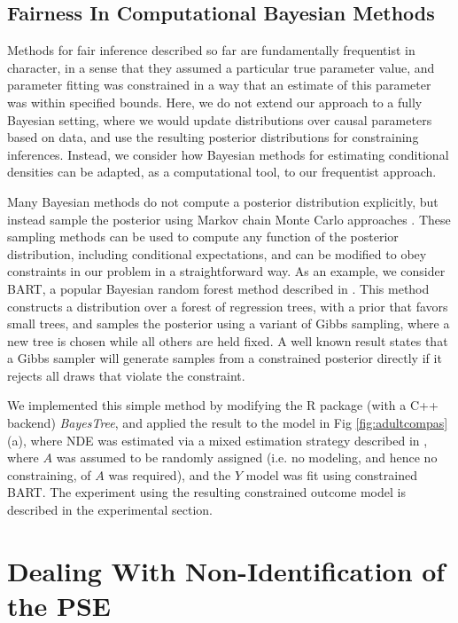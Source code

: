\documentclass[letterpaper]{article} %
\newcommand{\citep}{\cite}
\begin{document}
\subsection{Fairness In Computational Bayesian Methods}
\label{subsec:bayes}

Methods for fair inference described so far are fundamentally frequentist in character, in a sense that they assumed a particular true parameter value, and parameter fitting was constrained in a way that an estimate of this parameter was within specified bounds.  Here, we do not extend our approach to a fully Bayesian setting, where we would update distributions over causal parameters based on data, and use the resulting posterior distributions for constraining inferences.  Instead, we consider how Bayesian methods for estimating conditional densities can be adapted, as a computational tool, to our frequentist approach.

Many Bayesian methods do not compute a posterior distribution explicitly, but instead sample the posterior using Markov chain Monte Carlo approaches \citep{metropolis53equations}.  These sampling methods can  be used to compute any function of the posterior distribution, including conditional expectations, and can be modified to obey constraints in our problem in a straightforward way.
As an example, we consider BART, a popular Bayesian random forest method described in \citep{chipman10bart}.  This method constructs a distribution over a forest of regression trees, with a prior that favors small trees, and samples the posterior using a variant of Gibbs sampling, where a new tree is chosen while all others are held fixed.  A well known result \citep{gelfand92bayesian} states that a Gibbs sampler will generate samples from a constrained posterior directly if it rejects all draws that violate the constraint.

We implemented this simple method by modifying the R package (with a C++ backend) \textit{BayesTree}, and applied the result to the model in Fig \ref{fig:adultcompas} (a), where NDE was estimated via %
a mixed estimation strategy described in \citep{tchetgen12semi2}, where $A$ was assumed to be randomly assigned (i.e. no modeling, and hence no constraining, of $A$ was required), and the $Y$ model was fit using constrained BART. The experiment using the resulting constrained outcome model is described in the experimental section.


\section{Dealing With Non-Identification of the PSE}
\label{sec:non-id}
\end{document}
